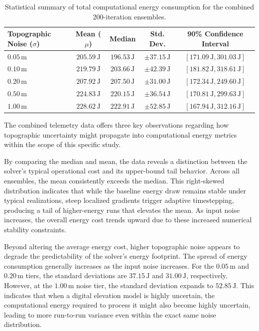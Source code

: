 \begin{table}[htbp]
\centering
\begin{tabular}{lcccc}
\toprule
\textbf{Topographic Noise ($\sigma$)} & \textbf{Mean ($\mu$)} & \textbf{Median} & \textbf{Std. Dev.} & \textbf{90\% Confidence Interval} \\
\midrule
$0.05\,\text{m}$ & $205.59\,\text{J}$ & $196.53\,\text{J}$ & $\pm 37.15\,\text{J}$ & $[171.09\,\text{J}, 301.03\,\text{J}]$ \\
$0.10\,\text{m}$ & $219.79\,\text{J}$ & $203.66\,\text{J}$ & $\pm 42.39\,\text{J}$ & $[181.82\,\text{J}, 318.61\,\text{J}]$ \\
$0.20\,\text{m}$ & $207.92\,\text{J}$ & $207.50\,\text{J}$ & $\pm 31.00\,\text{J}$ & $[172.34\,\text{J}, 249.60\,\text{J}]$ \\
$0.50\,\text{m}$ & $224.83\,\text{J}$ & $220.15\,\text{J}$ & $\pm 36.54\,\text{J}$ & $[170.81\,\text{J}, 299.63\,\text{J}]$ \\
$1.00\,\text{m}$ & $228.62\,\text{J}$ & $222.91\,\text{J}$ & $\pm 52.85\,\text{J}$ & $[167.94\,\text{J}, 312.16\,\text{J}]$ \\
\bottomrule
\end{tabular}
\caption{Statistical summary of total computational energy consumption for the combined 200-iteration ensembles.}
\label{tab:combined-energy-stats}
\end{table}

The combined telemetry data offers three key observations regarding how topographic uncertainty might propagate into computational energy metrics within the scope of this specific study.

By comparing the median and mean, the data reveals a distinction between the solver's typical operational cost and its upper-bound tail behavior. Across all ensembles, the mean consistently exceeds the median. This right-skewed distribution indicates that while the baseline energy draw remains stable under typical realizations, steep localized gradients trigger adaptive timestepping, producing a tail of higher-energy runs that elevates the mean. As input noise increases, the overall energy cost trends upward due to these increased numerical stability constraints.

Beyond altering the average energy cost, higher topographic noise appears to degrade the predictability of the solver's energy footprint. The spread of energy consumption generally increases as the input noise increases. For the $0.05\,\text{m}$ and $0.20\,\text{m}$ tiers, the standard deviations are $37.15\,\text{J}$ and $31.00\,\text{J}$, respectively. However, at the $1.00\,\text{m}$ noise tier, the standard deviation expands to $52.85\,\text{J}$. This indicates that when a digital elevation model is highly uncertain, the computational energy required to process it might also become highly uncertain, leading to more run-to-run variance even within the exact same noise distribution.

